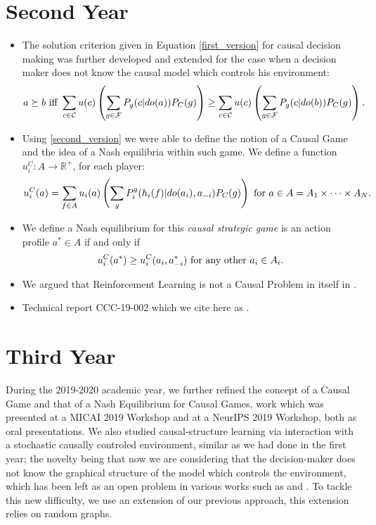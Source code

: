 \documentclass[english,letterpaper,12pt,final]{article}
\theoremstyle{definition}
\begin{document}
\section{Second Year}
\begin{itemize}
\item The solution criterion given in Equation \ref{first_version} for causal decision making was further developed and extended for the case when a decision maker does not know the causal model which controls his environment:
\begin{equation}{\label{second_version}}
a \succeq b \textrm{ iff } \sum_{c \in \mathcal{C}} u(c) \left( \sum_{g \in \mathcal{F}} P_g(c | do(a))P_C(g) \right) \geq \sum_{c \in \mathcal{C}}  u(c) \left( \sum_{g \in \mathcal{F}} P_g(c | do(b))P_C(g) \right).
\end{equation}
\item Using \ref{second_version} we were able to define the notion of a Causal Game and the idea of a Nash equilibria within such game. We define a function $u^C_i : A \to \mathbb{R}^{+}$, for each player:
\begin{equation}{\label{games_causal_ut}}
u^C_i (a) = \sum_{f \in A}  u_i(a) \left( \sum_g P^g_i (h_i(f) | do(a_i), a_{-i}) P_C(g) \right) \textrm{ for } a \in A=A_1 \times \cdots \times A_N.
\end{equation}
\item We define a Nash equilibrium for this \textit{causal strategic game} is an action profile $a^\ast \in A$ if and only if
\begin{equation}{\label{nash_eq}}
 u^C_i(a^\ast) \geq u^C_i(a_i, a^\ast_{-i}) \textrm{ for any other } a_i \in A_i. 
 \end{equation}
 \item We argued that Reinforcement Learning is not a Causal Problem in itself in \cite{gonzalez2019reinforcement}.
 \item Technical report CCC-19-002 which we cite here as \cite{gonzalez2019causal}. 
\end{itemize}

\section{Third Year}
During the 2019-2020 academic year, we further refined the concept of a Causal Game and that of a Nash Equilibrium for Causal Games, work which was presented at a MICAI 2019 Workshop and at a NeurIPS 2019 Workshop, both as oral presentations. We also studied causal-structure learning via interaction with a stochastic causally controled environment, similar as we had done in the first year; the novelty being that now we are considering that the decision-maker does not know the graphical structure of the model which controls the environment, which has been left as an open problem in various works such as \cite{lattimoreNIPS2016} and \cite{sen2017identifying}. To tackle this new difficulty, we use an extension of our previous approach, this extension relies on random graphs.
\end{document}
